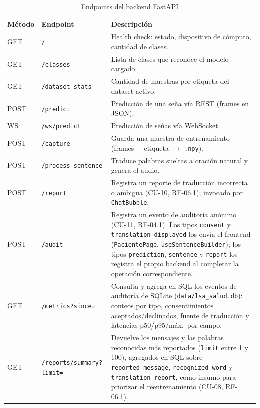 \begin{table}[H]
    \centering
    \caption{Endpoints del backend FastAPI}
    \label{tab:endpoints}
    \begin{tabularx}{\textwidth}{l l X}
        \toprule
        \textbf{Método} & \textbf{Endpoint} & \textbf{Descripción} \\
        \midrule
        GET & \texttt{/} & Health check: estado, dispositivo de cómputo, cantidad de clases. \\
        GET & \texttt{/classes} & Lista de clases que reconoce el modelo cargado. \\
        GET & \texttt{/dataset\_stats} & Cantidad de muestras por etiqueta del dataset activo. \\
        POST & \texttt{/predict} & Predicción de una seña vía REST (frames en JSON). \\
        WS & \texttt{/ws/predict} & Predicción de señas vía WebSocket. \\
        POST & \texttt{/capture} & Guarda una muestra de entrenamiento (frames + etiqueta $\rightarrow$ \texttt{.npy}). \\
        POST & \texttt{/process\_sentence} & Traduce palabras sueltas a oración natural y genera el audio. \\
        \midrule
        POST & \texttt{/report} & Registra un reporte de traducción incorrecta o ambigua (CU-10, RF-06.1); invocado por \texttt{ChatBubble}. \\
        POST & \texttt{/audit} & Registra un evento de auditoría anónimo (CU-11, RF-04.1). Los tipos \texttt{consent} y \texttt{translation\_displayed} los envía el frontend (\texttt{PacientePage}, \texttt{useSentenceBuilder}); los tipos \texttt{prediction}, \texttt{sentence} y \texttt{report} los registra el propio backend al completar la operación correspondiente. \\
        GET & \texttt{/metrics?since=} & Consulta y agrega en SQL los eventos de auditoría de SQLite (\texttt{data/lsa\_salud.db}): conteos por tipo, consentimientos aceptados/declinados, fuente de traducción y latencias p50/p95/máx.\ por campo. \\
        GET & \texttt{/reports/summary?limit=} & Devuelve los mensajes y las palabras reconocidas más reportados (\texttt{limit} entre 1 y 100), agregados en SQL sobre \texttt{reported\_message}, \texttt{recognized\_word} y \texttt{translation\_report}, como insumo para priorizar el reentrenamiento (CU-08, RF-06.1). \\
        \bottomrule
    \end{tabularx}
\end{table}

